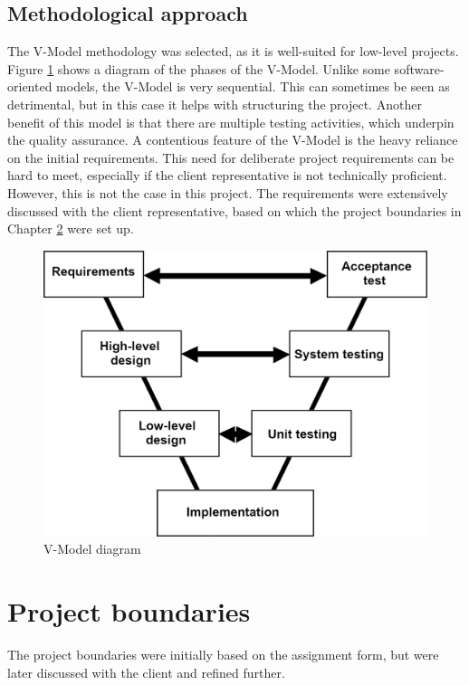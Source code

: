 \documentclass{report}
\begin{document}
	
	
	\section{Methodological approach}\label{methodological_approach}
	The V-Model methodology was selected, as it is well-suited for low-level projects. Figure \ref{fig:vmodel} shows a diagram of the phases of the V-Model. Unlike some software-oriented models, the V-Model is very sequential. This can sometimes be seen as detrimental, but in this case it helps with structuring the project. Another benefit of this model is that there are multiple testing activities, which underpin the quality assurance. A contentious feature of the V-Model is the heavy reliance on the initial requirements. This need for deliberate project requirements can be hard to meet, especially if the client representative is not technically proficient. However, this is not the case in this project. The requirements were extensively discussed with the client representative, based on which the project boundaries in Chapter \ref{project_boundaries} were set up.
	
	\begin{figure}[ht]
		\centering
		\includegraphics[width=0.7\linewidth]{img/vmodel}
		\caption{V-Model diagram}
		\label{fig:vmodel}
	\end{figure}

	\chapter{Project boundaries} \label{project_boundaries}
	The project boundaries were initially based on the assignment form, but were later discussed with the client and refined further. 
	
\end{document}
